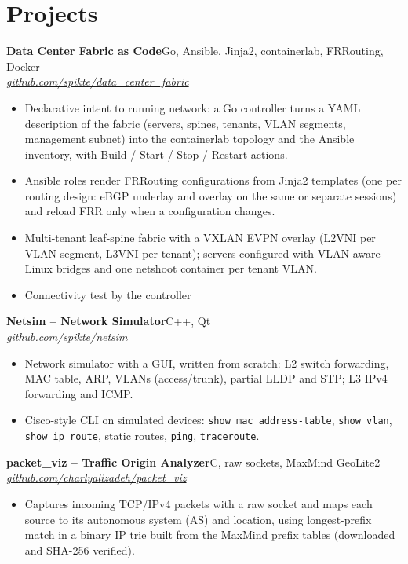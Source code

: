 \documentclass[9pt,a4paper]{extarticle}
\newcommand{\entry}[4]{%
  \textbf{#1}\hfill #2\\[-0.1em]
  \textit{#3}\hfill \textit{#4}\par\vspace{0.1em}}
\begin{document}
\section{Projects}

\entry{Data Center Fabric as Code}{Go, Ansible, Jinja2, containerlab, FRRouting, Docker}{}{\href{https://github.com/spikte/data_center_fabric}{github.com/spikte/data\_center\_fabric}}
\begin{itemize}
  \item Declarative intent to running network: a Go controller turns a YAML description of the fabric (servers, spines, tenants, VLAN segments, management subnet) into the containerlab topology and the Ansible inventory, with Build / Start / Stop / Restart actions.
  \item Ansible roles render FRRouting configurations from Jinja2 templates (one per routing design: eBGP underlay and overlay on the same or separate sessions) and reload FRR only when a configuration changes.
  \item Multi-tenant leaf-spine fabric with a VXLAN EVPN overlay (L2VNI per VLAN segment, L3VNI per tenant); servers configured with VLAN-aware Linux bridges and one netshoot container per tenant VLAN.
  \item Connectivity test by the controller
\end{itemize}

\entry{Netsim -- Network Simulator}{C++, Qt}{}{\href{https://github.com/spikte/netsim}{github.com/spikte/netsim}}
\begin{itemize}
  \item Network simulator with a GUI, written from scratch: L2 switch forwarding, MAC table, ARP, VLANs (access/trunk), partial LLDP and STP; L3 IPv4 forwarding and ICMP.
  \item Cisco-style CLI on simulated devices: \texttt{show mac address-table}, \texttt{show vlan}, \texttt{show ip route}, static routes, \texttt{ping}, \texttt{traceroute}.
\end{itemize}

\entry{packet\_viz -- Traffic Origin Analyzer}{C, raw sockets, MaxMind GeoLite2}{}{\href{https://github.com/charlyalizadeh/packet_viz}{github.com/charlyalizadeh/packet\_viz}}
\begin{itemize}
  \item Captures incoming TCP/IPv4 packets with a raw socket and maps each source to its autonomous system (AS) and location, using longest-prefix match in a binary IP trie built from the MaxMind prefix tables (downloaded and SHA-256 verified).
\end{itemize}
\end{document}
